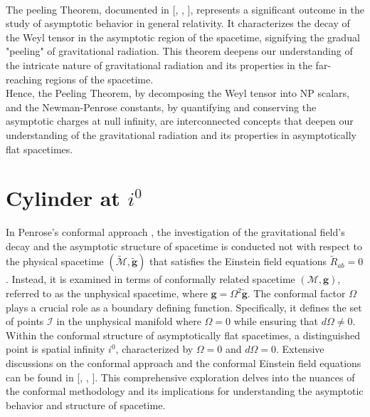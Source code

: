 \\
The peeling Theorem, documented in [\cite{Sac61}, \cite{BonBurMet62}, \cite{NewPen62}], represents a significant outcome in the study of asymptotic behavior in general relativity. It characterizes the decay of the Weyl tensor in the asymptotic region of the spacetime, signifying the gradual "peeling" of gravitational radiation. This theorem deepens our understanding of the intricate nature of gravitational radiation and its properties in the far-reaching regions of the spacetime.
\\
Hence, the Peeling Theorem, by decomposing the Weyl tensor into NP scalars, and the Newman-Penrose constants, by quantifying and conserving the asymptotic charges at null infinity, are interconnected concepts that deepen our understanding of the gravitational radiation and its properties in asymptotically flat spacetimes.

\chapter{Cylinder at $i^0$}
\label{chapter:cylinder}

In Penrose's conformal approach \cite{Pen63}, the investigation of the gravitational field's decay and the asymptotic structure of spacetime is conducted not with respect to the physical spacetime $(\tilde{\mathcal{M}}, \tilde{\boldsymbol{g}})$ that satisfies the Einstein field equations $\tilde{R}_{a b}=0$. Instead, it is examined in terms of conformally related spacetime $(\mathcal{M}, \boldsymbol{g})$, referred to as the unphysical spacetime, where $\boldsymbol{g}=\Omega^2 \tilde{\boldsymbol{g}}$. The conformal factor $\Omega$ plays a crucial role as a boundary defining function. Specifically, it defines the set of points $\mathscr{I}$ in the unphysical manifold where $\Omega = 0$ while ensuring that $d\Omega \neq 0$.
\\
Within the conformal structure of asymptotically flat spacetimes, a distinguished point is spatial infinity $i^0$, characterized by $\Omega = 0$ and $d\Omega = 0$. Extensive discussions on the conformal approach and the conformal Einstein field equations can be found in [\cite{Val16}, \cite{Fra04}, \cite{Fri02}]. This comprehensive exploration delves into the nuances of the conformal methodology and its implications for understanding the asymptotic behavior and structure of spacetime.

